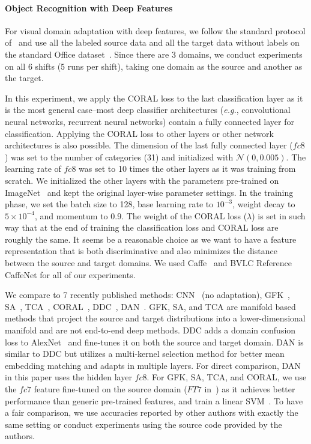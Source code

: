 \documentclass[graybox]{svmult}
\newcommand\eg{\emph{e.g.}}
\begin{document}
\paragraph{\textbf{Object Recognition with Deep Features}} 
For visual domain adaptation with deep features, we follow the standard protocol of~\cite{gfk,dan_long15,decaf,tzeng_arxiv15,reversegrad} and use all the labeled source data and all the target data without labels on the standard Office dataset~\cite{saenko2010adapting}. Since there are 3 domains, we conduct experiments on all 6 shifts (5 runs per shift), taking one domain as the source and another as the target. 

In this experiment, we apply the CORAL loss to the last classification layer
as it is the most general case--most deep classifier architectures (\eg, convolutional neural networks, recurrent neural networks) contain a fully connected layer for classification. Applying the CORAL loss to other layers or other network architectures is also possible. The dimension of the last fully connected layer ($fc8$) was set to the number of categories (31) and initialized with $\mathcal{N}(0,0.005)$. The learning rate of $fc8$ was set to 10 times the other layers as it was training from scratch. We initialized the other layers with the parameters pre-trained on ImageNet~\cite{imagenet} and kept the original layer-wise parameter settings. In the training phase, we set the batch size to 128, base learning rate to $10^{-3}$, weight decay to $5\times10^{-4}$, and momentum to 0.9. The weight of the CORAL loss ($\lambda$) is set in such way that at the end of training the classification loss and CORAL loss are roughly the same. It seems be a reasonable choice as we want to have a feature representation that is both discriminative and also minimizes the distance between the source and target domains. We used Caffe~\cite{caffe} and BVLC Reference CaffeNet for all of our experiments.

We compare to 7 recently published methods: CNN~\cite{alexnet} (no adaptation), GFK~\cite{gfk}, SA~\cite{sa}, TCA~\cite{tca}, CORAL~\cite{coral}, DDC~\cite{tzeng_arxiv15}, DAN~\cite{dan_long15}. GFK, SA, and TCA are manifold based methods that project the source and target distributions into a lower-dimensional manifold and are not end-to-end deep methods. DDC adds a domain confusion loss to AlexNet~\cite{alexnet} and fine-tunes it on both the source and target domain. DAN is similar to DDC but utilizes a multi-kernel selection method for better mean embedding matching and adapts in multiple layers. For direct comparison, DAN in this paper uses the hidden layer $fc8$. For GFK, SA, TCA, and CORAL, we use the $fc7$ feature fine-tuned on the source domain ($FT7$ in~\cite{coral}) as it achieves better performance than generic pre-trained features, and train a linear SVM~\cite{sa,coral}. To have a fair comparison, we use accuracies reported by other authors with exactly the same setting or conduct experiments using the source code provided by the authors.
\end{document}
